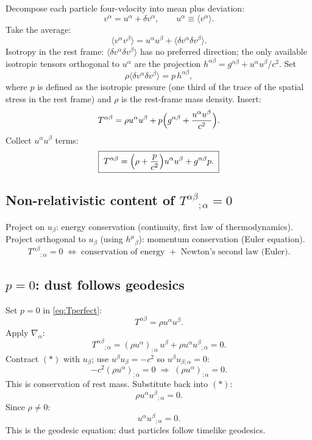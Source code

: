 \documentclass[11pt]{article}
\begin{document}
Decompose each particle four-velocity into mean plus deviation:
\[ v^{\alpha} = u^{\alpha} + \delta v^{\alpha},\qquad u^{\alpha}\equiv\langle v^{\alpha}\rangle. \]
Take the average:
\[ \langle v^{\alpha}v^{\beta}\rangle = u^{\alpha}u^{\beta} + \langle \delta v^{\alpha}\delta v^{\beta}\rangle. \]
Isotropy in the rest frame: $\langle \delta v^{\alpha}\delta v^{\beta}\rangle$ has no preferred direction; the only available isotropic tensors orthogonal to $u^{\alpha}$ are the projection $h^{\alpha\beta}=g^{\alpha\beta}+u^{\alpha}u^{\beta}/c^{2}$. Set
\[ \rho\langle\delta v^{\alpha}\delta v^{\beta}\rangle = p\,h^{\alpha\beta}, \]
where $p$ is defined as the isotropic pressure (one third of the trace of the spatial stress in the rest frame) and $\rho$ is the rest-frame mass density. Insert:
\[ T^{\alpha\beta} = \rho u^{\alpha}u^{\beta} + p\Bigl(g^{\alpha\beta}+\frac{u^{\alpha}u^{\beta}}{c^{2}}\Bigr). \]
Collect $u^{\alpha}u^{\beta}$ terms:
\[ \boxed{\;T^{\alpha\beta} = \Bigl(\rho+\frac{p}{c^{2}}\Bigr)u^{\alpha}u^{\beta} + g^{\alpha\beta}p.\;}\label{eq:Tperfect} \]

\subsection*{Non-relativistic content of $T^{\alpha\beta}{}_{;\alpha}=0$}

Project on $u_{\beta}$: energy conservation (continuity, first law of thermodynamics).\\
Project orthogonal to $u_{\beta}$ (using $h^{\mu}{}_{\beta}$): momentum conservation (Euler equation).
\[ \boxed{\;T^{\alpha\beta}{}_{;\alpha}=0\;\Leftrightarrow\;\text{conservation of energy }+\text{ Newton's second law (Euler).}\;} \]

\subsection*{$p=0$: dust follows geodesics}

Set $p=0$ in \eqref{eq:Tperfect}:
\[ T^{\alpha\beta} = \rho u^{\alpha}u^{\beta}. \]
Apply $\nabla_{\alpha}$:
\[ T^{\alpha\beta}{}_{;\alpha} = (\rho u^{\alpha})_{;\alpha}\,u^{\beta} + \rho u^{\alpha}u^{\beta}{}_{;\alpha} = 0. \tag{$\ast$}\]
Contract $(\ast)$ with $u_{\beta}$; use $u^{\beta}u_{\beta}=-c^{2}$ so $u^{\beta}u_{\beta;\alpha}=0$:
\[ -c^{2}(\rho u^{\alpha})_{;\alpha} = 0\;\Rightarrow\;(\rho u^{\alpha})_{;\alpha}=0. \]
This is conservation of rest mass. Substitute back into $(\ast)$:
\[ \rho u^{\alpha}u^{\beta}{}_{;\alpha} = 0. \]
Since $\rho\ne 0$:
\[ \boxed{\;u^{\alpha}u^{\beta}{}_{;\alpha} = 0.\;} \]
This is the geodesic equation: dust particles follow timelike geodesics.
\end{document}
